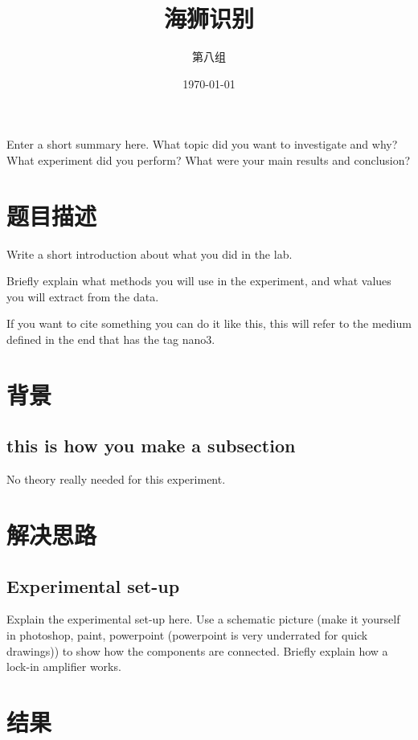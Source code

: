 \documentclass[a4paper]{article}
\title{海狮识别}
\author{第八组}
\date{\today}
\begin{document}
\maketitle

\renewcommand{\abstractname}{摘要}
\begin{onecolabstract}
Enter a short summary here. What topic did you want to investigate and why? What experiment did you perform? What were your main results and conclusion?
\end{onecolabstract}

\section{题目描述}
\label{sec:introduction}

Write a short introduction about what you did in the lab.

Briefly explain what methods you will use in the experiment, and what values you will extract from the data.

If you want to cite something you can do it like this\cite{nano3}, this will refer to the medium defined in the end that has the tag nano3.

\section{背景}
\label{sec:theory}

\subsection{this is how you make a subsection}
No theory really needed for this experiment.

\section{解决思路}

\subsection{Experimental set-up}
Explain the experimental set-up here. Use a schematic picture (make it yourself in photoshop, paint, powerpoint (powerpoint is very underrated for quick drawings)) to show how the components are connected. Briefly explain how a lock-in amplifier works.

\section{结果}
\end{document}
